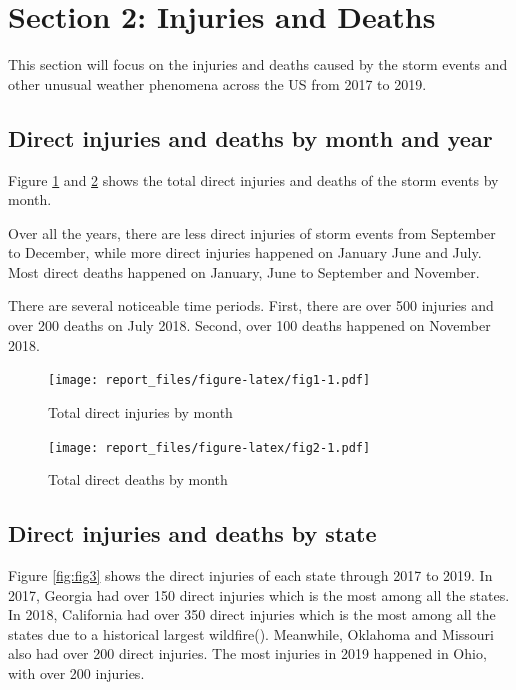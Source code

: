 \documentclass[
]{article}
\begin{document}
\clearpage

\hypertarget{section-2-injuries-and-deaths}{%
\section{Section 2: Injuries and Deaths}\label{section-2-injuries-and-deaths}}

This section will focus on the injuries and deaths caused by the storm events and other unusual weather phenomena across the US from 2017 to 2019.

\hypertarget{direct-injuries-and-deaths-by-month-and-year}{%
\subsection{Direct injuries and deaths by month and year}\label{direct-injuries-and-deaths-by-month-and-year}}

Figure \ref{fig:fig1} and \ref{fig:fig2} shows the total direct injuries and deaths of the storm events by month.

Over all the years, there are less direct injuries of storm events from September to December, while more direct injuries happened on January June and July. Most direct deaths happened on January, June to September and November.

There are several noticeable time periods. First, there are over 500 injuries and over 200 deaths on July 2018. Second, over 100 deaths happened on November 2018.

\begin{figure}
\centering
\texttt{[image: report\_files/figure-latex/fig1-1.pdf]}
\caption{\label{fig:fig1}Total direct injuries by month}
\end{figure}

\begin{figure}
\centering
\texttt{[image: report\_files/figure-latex/fig2-1.pdf]}
\caption{\label{fig:fig2}Total direct deaths by month}
\end{figure}

\clearpage

\hypertarget{direct-injuries-and-deaths-by-state}{%
\subsection{Direct injuries and deaths by state}\label{direct-injuries-and-deaths-by-state}}

Figure \ref{fig:fig3} shows the direct injuries of each state through 2017 to 2019. In 2017, Georgia had over 150 direct injuries which is the most among all the states. In 2018, California had over 350 direct injuries which is the most among all the states due to a historical largest wildfire(\citet{california}). Meanwhile, Oklahoma and Missouri also had over 200 direct injuries. The most injuries in 2019 happened in Ohio, with over 200 injuries.
\end{document}
